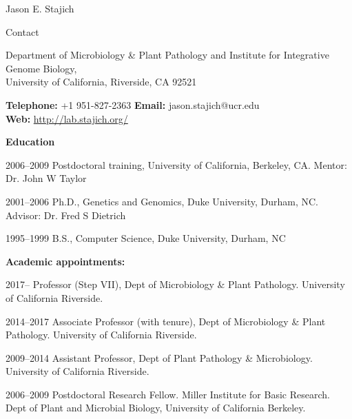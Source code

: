 \documentclass[10pt]{article}
\begin{document}
\begin{cv}{\centerline{Jason E. Stajich}}


\setlength{\cvlabelwidth}{18mm}
\begin{cvlistcompact}{Contact}
\item{Department of Microbiology \& Plant Pathology and Institute for
  Integrative Genome Biology, \\
  University of California, Riverside, CA 92521}
  \item{ \textbf{Telephone:} +1 951-827-2363 \textbf{Email:}
    jason.stajich@ucr.edu \\
    \textbf{Web:} \url{http://lab.stajich.org/}}
\end{cvlistcompact}

\begin{cvlistcompact}{\bf Education}
\item [2006--2009] Postdoctoral training, University of California, Berkeley, CA. Mentor: Dr. John W Taylor
\item [2001--2006] Ph.D., Genetics and Genomics, Duke University, Durham, NC. Advisor: Dr. Fred S Dietrich
\item [1995--1999] B.S., Computer Science, Duke University, Durham, NC
\end{cvlistcompact}

\begin{cvlistcompact}{\bf Academic appointments:}
\item [2017--] Professor (Step VII), Dept of Microbiology \& Plant Pathology. University of California Riverside.
\item [2014--2017] Associate Professor (with tenure), Dept of Microbiology \& Plant Pathology. University of California Riverside.
\item [2009--2014] Assistant Professor, Dept of Plant Pathology \& Microbiology. University of California Riverside.
\item [2006--2009] Postdoctoral Research Fellow. Miller Institute for Basic Research. \\
  Dept of Plant and Microbial Biology, University of California
  Berkeley. \\
\end{cvlistcompact}


\end{cv}
\end{document}
